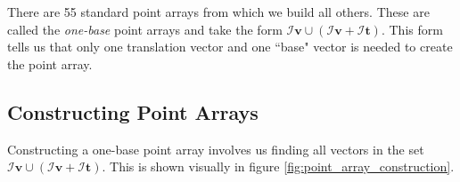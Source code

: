 \documentclass[a4paper,10pt]{article}
\theoremstyle{plain}
\theoremstyle{definition}
\theoremstyle{remark}
\renewcommand{\vec}[1]{\mathbf{#1}}
\begin{document}
There are 55 standard point arrays from which we build all others.
These are called the \emph{one-base} point arrays and take the form \(\mathcal{I}\vec{v} \cup (\mathcal{I}\vec{v} + \mathcal{I}\vec{t})\). This form tells us that only one translation vector and one ``base" vector is needed to create the point array. \cite{keeftwarock2009affine}


\subsection{Constructing Point Arrays}
Constructing a one-base point array involves us finding all vectors in the set \(\mathcal{I}\vec{v} \cup (\mathcal{I}\vec{v} + \mathcal{I}\vec{t})\).
This is shown visually in figure \ref{fig:point_array_construction}.
\end{document}
